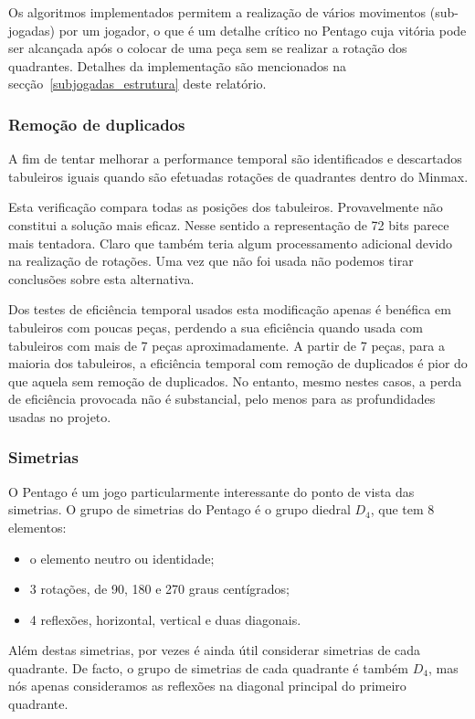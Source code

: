 Os algoritmos implementados permitem a realização de vários movimentos (sub-jogadas) por um jogador, o que é um detalhe crítico no Pentago cuja vitória pode ser alcançada após o colocar de uma peça sem se realizar a rotação dos quadrantes. Detalhes da implementação são mencionados na secção~\ref{subjogadas_estrutura} deste relatório.

\subsubsection{Remoção de duplicados}

A fim de tentar melhorar a performance temporal são identificados e descartados tabuleiros iguais quando são efetuadas rotações de quadrantes dentro do Minmax. 

Esta verificação compara todas as posições dos tabuleiros. Provavelmente não constitui a solução mais eficaz. Nesse sentido a representação de 72 bits parece mais tentadora. Claro que  também teria algum processamento adicional devido na realização de rotações. Uma vez que não foi usada não podemos tirar conclusões sobre esta alternativa. 

Dos testes de eficiência temporal usados esta modificação apenas é benéfica em tabuleiros com poucas peças, perdendo a sua eficiência quando usada com tabuleiros com mais de 7 peças aproximadamente. A partir de 7 peças, para a maioria dos tabuleiros, a eficiência temporal com remoção de duplicados é pior do que aquela sem remoção de duplicados. No entanto, mesmo nestes casos, a perda de eficiência provocada não é substancial, pelo menos para as profundidades usadas no projeto.

\subsubsection{Simetrias}

O Pentago é um jogo particularmente interessante do ponto de vista das simetrias. O grupo de simetrias do Pentago é o grupo diedral $D_4$, que tem 8 elementos:
\begin{itemize}
	\item o elemento neutro ou identidade;
	\item 3 rotações, de 90, 180 e 270 graus centígrados;
	\item 4 reflexões, horizontal, vertical e duas diagonais.
\end{itemize}

Além destas simetrias, por vezes é ainda útil considerar simetrias de cada quadrante. De facto, o grupo de simetrias de cada quadrante é também $D_4$, mas nós apenas consideramos as reflexões na diagonal principal do primeiro quadrante. 

